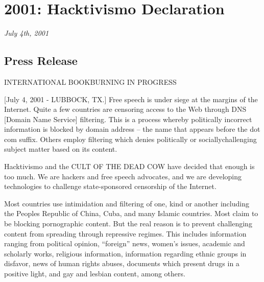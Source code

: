 \documentclass[letterpaper,12pt,english]{sphinxmanual}
\begin{document}
\chapter{2001: Hacktivismo Declaration}
\label{2001:hacktivismo-declaration}\label{2001::doc}\label{2001:index-0}
\emph{July 4th, 2001}


\section{Press Release}
\label{2001:press-release}
INTERNATIONAL BOOKBURNING IN PROGRESS

{[}July 4, 2001 - LUBBOCK, TX.{]} Free speech is under siege at the margins of the Internet. Quite a few countries are censoring access to the Web through DNS {[}Domain Name Service{]} filtering. This is a process whereby politically incorrect information is blocked by domain address -- the name that appears before the dot com suffix. Others employ filtering which denies politically or sociallychallenging subject matter based on its content.

Hacktivismo and the CULT OF THE DEAD COW have decided that enough is too much. We are hackers and free speech advocates, and we are developing technologies to challenge state-sponsored censorship of the Internet.

Most countries use intimidation and filtering of one, kind or another including the Peoples Republic of China, Cuba, and many Islamic countries. Most claim to be blocking pornographic content. But the real reason is to prevent challenging content from spreading through repressive regimes. This includes information ranging from political opinion, ``foreign'' news, women's issues, academic and scholarly works, religious information, information regarding ethnic groups in disfavor, news of human rights abuses, documents which present drugs in a positive light, and gay and lesbian
content, among others.
\end{document}
